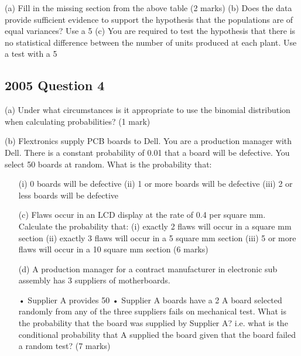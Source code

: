 \documentclass[]{report}
\begin{document}
\begin{enumerate}[(i)]
(a)	Fill in the missing section from the above table			(2 marks)
(b)	Does the data provide sufficient evidence to support the hypothesis that the populations are of equal variances?  Use a 5%
(c)	You are required to test the hypothesis that there is no statistical difference between the number of units produced at each plant.  Use a test with a 5%


\subsection{2005 Question 4}
(a)	Under what circumstances is it appropriate to use the binomial distribution when calculating probabilities?					(1 mark)

(b) 	Flextronics supply PCB boards to Dell.  You are a production manager with Dell.  There is a constant probability of 0.01 that a board will be defective.  You select 50 boards at random.  What is the probability that:
\begin{itemize}
	\item[(i)]	0 boards will be defective
	(ii)	1 or more boards will be defective
	(iii)	2 or less boards will be defective			
	
	
	
	(c)	Flaws occur in an LCD display at the rate of 0.4 per square mm.  Calculate the probability that:
	(i)	exactly 2 flaws will occur in a square mm section
	(ii)	exactly 3 flaws will occur in a 5 square mm section
	(iii)	5 or more flaws will occur in a 10 square mm section
	(6 marks)
	

(d)	A production manager for a contract manufacturer in electronic sub assembly has 3 suppliers of motherboards. 

	•	Supplier A provides 50%
	•	Supplier A boards have a 2%
	A board selected randomly from any of the three suppliers fails on mechanical test.  What is the probability that the board was supplied by Supplier A? i.e. what is the conditional probability that A supplied the board given that the board failed a random test?
	(7 marks)
	

\end{itemize}
\end{enumerate}
\end{document}
